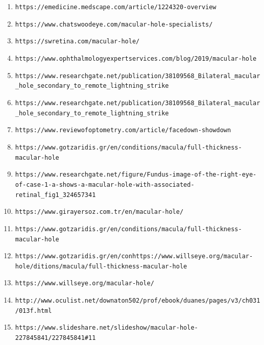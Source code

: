 \documentclass{article}
\begin{document}
	\begin{enumerate}
			\item \nolinkurl{https://emedicine.medscape.com/article/1224320-overview}
			
			\item \nolinkurl{https://www.chatswoodeye.com/macular-hole-specialists/}
			
			\item \nolinkurl{https://swretina.com/macular-hole/}
			
			\item \nolinkurl{https://www.ophthalmologyexpertservices.com/blog/2019/macular-hole}
			
			\item \nolinkurl{https://www.researchgate.net/publication/38109568_Bilateral_macular_hole_secondary_to_remote_lightning_strike}
			
			\item \nolinkurl{https://www.researchgate.net/publication/38109568_Bilateral_macular_hole_secondary_to_remote_lightning_strike}
			
			\item \nolinkurl{https://www.reviewofoptometry.com/article/facedown-showdown}
			
			\item \nolinkurl{https://www.gotzaridis.gr/en/conditions/macula/full-thickness-macular-hole}
			
			\item \nolinkurl{https://www.researchgate.net/figure/Fundus-image-of-the-right-eye-of-case-1-a-shows-a-macular-hole-with-associated-retinal_fig1_324657341}
			
			\item \nolinkurl{https://www.girayersoz.com.tr/en/macular-hole/}
			
			\item \nolinkurl{https://www.gotzaridis.gr/en/conditions/macula/full-thickness-macular-hole}
			
			\item \nolinkurl{https://www.gotzaridis.gr/en/conhttps://www.willseye.org/macular-hole/ditions/macula/full-thickness-macular-hole}
			
			\item \nolinkurl{https://www.willseye.org/macular-hole/}
			
			\item \nolinkurl{http://www.oculist.net/downaton502/prof/ebook/duanes/pages/v3/ch031/013f.html}
			
			\item \nolinkurl{https://www.slideshare.net/slideshow/macular-hole-227845841/227845841#11}
			

\end{enumerate}
\end{document}
